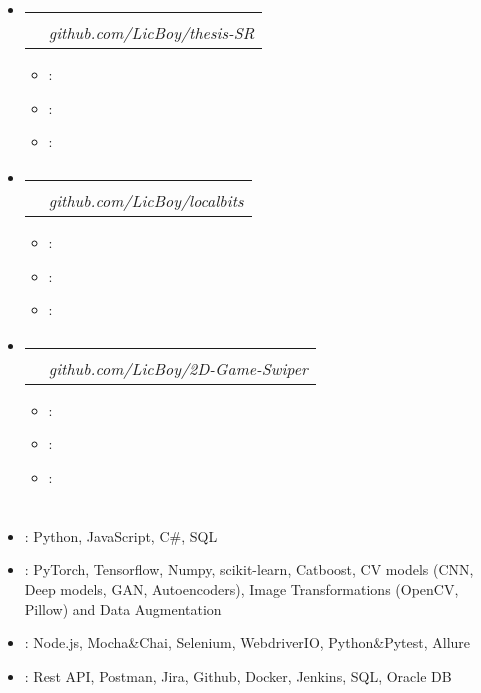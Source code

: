 \documentclass[12pt, letterpaper]{article}
\makeatletter
\newcommand{\resumeItem}[2]{
  \item\small{
    \textbf{#1}{: #2 \vspace{-2pt}}
  }
}
\newcommand{\resumeSubheading}[4]{
  \vspace{-1pt}\item
    \begin{tabular*}{0.97\textwidth}{l@{\extracolsep{\fill}}r}
      \textbf{#1} & #2 \\
      \textit{\small#3} & \textit{\small #4} \\
    \end{tabular*}\vspace{-5pt}
}
\newcommand{\resumeSubHeadingListStart}{\begin{itemize}[leftmargin=*]}
\newcommand{\resumeSubHeadingListEnd}{\end{itemize}}
\newcommand{\resumeItemListStart}{\begin{itemize}}
\newcommand{\resumeItemListEnd}{\end{itemize}\vspace{-5pt}}
\makeatother
\begin{document}
\section{\projectsWord}
   \resumeSubHeadingListStart
    \resumeSubheading
      {\projectFirstName}{\textit{\projectFirstDate}}
      {\projectPositionCreator}{github.com/LicBoy/thesis-SR}
      \resumeItemListStart
        \resumeItem{\projectFirstTitleFirst}{\projectFirstDescFirst}
        \resumeItem{\projectFirstTitleSecond}{\projectFirstDescSecond}
        \resumeItem{\projectFirstTitleThird}{\projectFirstDescThird}
      \resumeItemListEnd

    \resumeSubheading
      {\projectSecondName}{\textit{\projectSecondDate}}
      {\projectPositionCreator}{github.com/LicBoy/localbits}
      \resumeItemListStart
        \resumeItem{\projectSecondTitleFirst}{\projectSecondDescFirst}
        \resumeItem{\projectSecondTitleSecond}{\projectSecondDescSecond}
        \resumeItem{\projectSecondTitleThird}{\projectSecondDescThird}
      \resumeItemListEnd

    \resumeSubheading
      {\projectThirdName}{\textit{\projectThirdDate}}
      {\projectPositionCreator}{github.com/LicBoy/2D-Game-Swiper}
      \resumeItemListStart
        \resumeItem{\projectThirdTitleFirst}{\projectThirdDescFirst}
        \resumeItem{\projectThirdTitleSecond}{\projectThirdDescSecond}
        \resumeItem{\projectThirdTitleThird}{\projectThirdDescThird}
      \resumeItemListEnd
  \resumeSubHeadingListEnd

%
\section{\skillsWord}
 \resumeSubHeadingListStart
   \item{
        \textbf{\skillProgLanguages}{: Python, JavaScript, C\#, SQL}
    }
    \item{
        \textbf{\skillMachineLearning}{: PyTorch, Tensorflow, Numpy, scikit-learn, Catboost, CV models (CNN, Deep models, GAN, Autoencoders), Image Transformations (OpenCV, Pillow) and Data Augmentation}
    }
    \item{
        \textbf{\skillAutoTesting}{: Node.js, Mocha\&Chai, Selenium, WebdriverIO, Python\&Pytest, Allure}
    }
    \item{
        \textbf{\skillTools}{: Rest API, Postman, Jira, Github, Docker, Jenkins, SQL, Oracle DB}
    }
 \resumeSubHeadingListEnd


\end{document}
